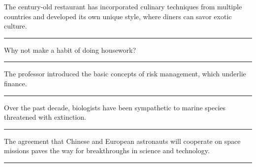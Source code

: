 \documentclass[11pt,a4paper]{article}
\newcommand{\num}[1]{\makebox[1.9em][r]{#1.}\hspace{0.3em}}
\newcommand{\wline}{\noindent\rule{\linewidth}{0.4pt}}
\begin{document}
\begin{minipage}{\linewidth}

\num{4}The century-old restaurant has incorporated culinary techniques from multiple countries and developed its own unique style, where diners can savor exotic culture.

\vspace{0.25em}

\wline

\end{minipage}

\vspace{0.35em}\vspace{0.15em}

\begin{minipage}{\linewidth}

\num{5}Why not make a habit of doing housework?

\vspace{0.25em}

\wline

\end{minipage}

\begin{minipage}{\linewidth}

\num{6}The professor introduced the basic concepts of risk management, which underlie finance.

\vspace{0.25em}

\wline

\end{minipage}

\begin{minipage}{\linewidth}

\num{7}Over the past decade, biologists have been sympathetic to marine species threatened with extinction.

\vspace{0.25em}

\wline

\end{minipage}

\begin{minipage}{\linewidth}

\num{8}The agreement that Chinese and European astronauts will cooperate on space missions paves the way for breakthroughs in science and technology.

\vspace{0.25em}

\wline

\end{minipage}
\end{document}
